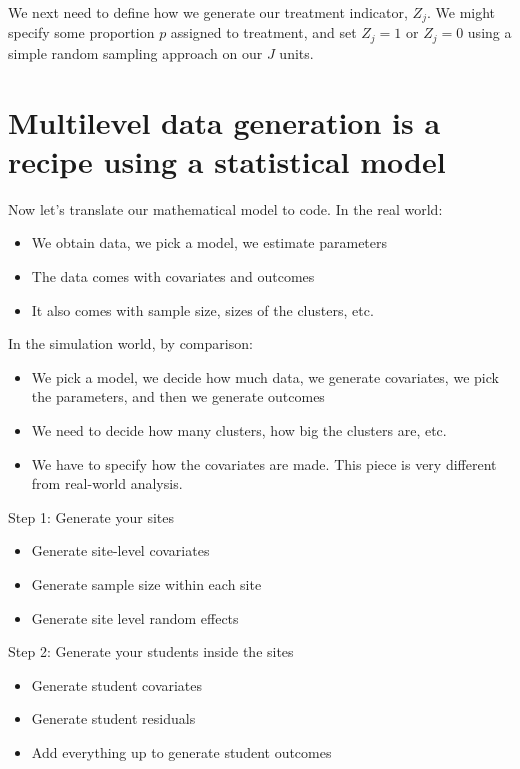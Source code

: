 \documentclass[
]{book}
\providecommand{\tightlist}{%
  \setlength{\itemsep}{0pt}\setlength{\parskip}{0pt}}
\begin{document}
We next need to define how we generate our treatment indicator, \(Z_j\).
We might specify some proportion \(p\) assigned to treatment, and set \(Z_j = 1\) or \(Z_j = 0\) using a simple random sampling approach on our \(J\) units.

\hypertarget{multilevel-data-generation-is-a-recipe-using-a-statistical-model}{%
\section{Multilevel data generation is a recipe using a statistical model}\label{multilevel-data-generation-is-a-recipe-using-a-statistical-model}}

Now let's translate our mathematical model to code.
In the real world:

\begin{itemize}
\tightlist
\item
  We obtain data, we pick a model, we estimate parameters
\item
  The data comes with covariates and outcomes
\item
  It also comes with sample size, sizes of the clusters, etc.
\end{itemize}

In the simulation world, by comparison:

\begin{itemize}
\tightlist
\item
  We pick a model, we decide how much data, we generate covariates, we pick the parameters, and then we generate outcomes
\item
  We need to decide how many clusters, how big the clusters are, etc.
\item
  We have to specify how the covariates are made. This piece is very different from real-world analysis.
\end{itemize}

Step 1: Generate your sites

\begin{itemize}
\tightlist
\item
  Generate site-level covariates
\item
  Generate sample size within each site
\item
  Generate site level random effects
\end{itemize}

Step 2: Generate your students inside the sites

\begin{itemize}
\tightlist
\item
  Generate student covariates
\item
  Generate student residuals
\item
  Add everything up to generate student outcomes
\end{itemize}
\end{document}
